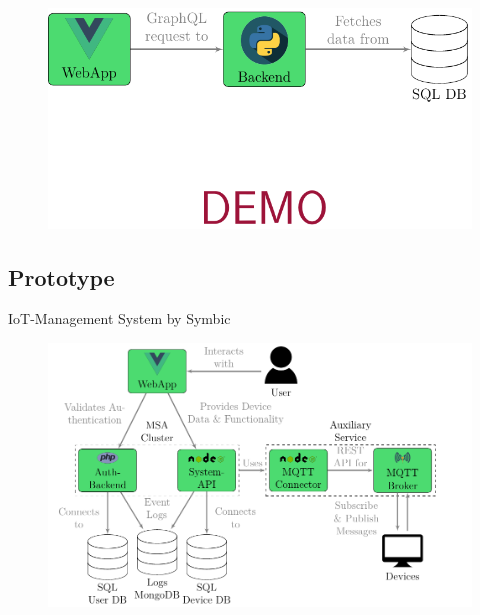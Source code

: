 \documentclass{beamer}
\begin{document}
\begin{frame}{}
  \vspace{-.5cm}
  \begin{center}
    \begin{figure}
      \includegraphics[width=.95\textwidth]{img/thesis_main-figure3.pdf}
    \end{figure}
  \end{center}
\end{frame}

\subsection{Prototype}
\begin{frame}{}
  \vspace{-0.2cm}
  \begin{center}
    \large IoT-Management System by Symbic
  \end{center}
  \vspace{-0.2cm}
  \begin{figure}
    \includegraphics[width=\textwidth]{img/thesis_main-figure1.pdf}
  \end{figure}
\end{frame}
\end{document}
